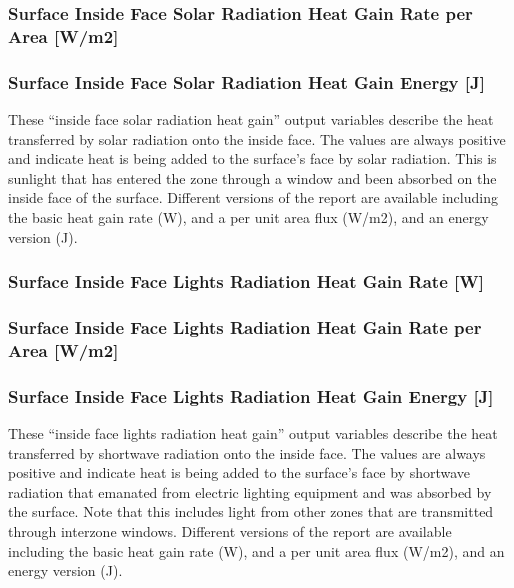 \subsubsection{Surface Inside Face Solar Radiation Heat Gain Rate per Area {[}W/m2{]}}\label{surface-inside-face-solar-radiation-heat-gain-rate-per-area-wm2}

\subsubsection{Surface Inside Face Solar Radiation Heat Gain Energy {[}J{]}}\label{surface-inside-face-solar-radiation-heat-gain-energy-j}

These ``inside face solar radiation heat gain'' output variables describe the heat transferred by solar radiation onto the inside face. The values are always positive and indicate heat is being added to the surface's face by solar radiation. This is sunlight that has entered the zone through a window and been absorbed on the inside face of the surface. Different versions of the report are available including the basic heat gain rate (W), and a per unit area flux (W/m2), and an energy version (J).

\subsubsection{Surface Inside Face Lights Radiation Heat Gain Rate {[}W{]}}\label{surface-inside-face-lights-radiation-heat-gain-rate-w}

\subsubsection{Surface Inside Face Lights Radiation Heat Gain Rate per Area {[}W/m2{]}}\label{surface-inside-face-lights-radiation-heat-gain-rate-per-area-wm2}

\subsubsection{Surface Inside Face Lights Radiation Heat Gain Energy {[}J{]}}\label{surface-inside-face-lights-radiation-heat-gain-energy-j}

These ``inside face lights radiation heat gain'' output variables describe the heat transferred by shortwave radiation onto the inside face. The values are always positive and indicate heat is being added to the surface's face by shortwave radiation that emanated from electric lighting equipment and was absorbed by the surface. Note that this includes light from other zones that are transmitted through interzone windows. Different versions of the report are available including the basic heat gain rate (W), and a per unit area flux (W/m2), and an energy version (J).

